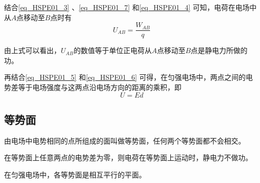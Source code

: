 结合\autoref{eq_HSPE01_3} 、\autoref{eq_HSPE01_7} 和\autoref{eq_HSPE01_4} 可知，电荷在电场中从$A$点移动至$B$点时有
\begin{equation}\label{eq_HSPE01_6}
U_{AB} = \frac{W_{AB}}{q}
\end{equation}

由上式可以看出，$U_{AB}$的数值等于单位正电荷从$A$点移动至$B$点是静电力所做的功。

再结合\autoref{eq_HSPE01_5} 和\autoref{eq_HSPE01_6} 可得，在匀强电场中，两点之间的电势差等于电场强度与这两点沿电场方向的距离的乘积，即
\begin{equation}
U=Ed
\end{equation}

\subsection{等势面}

由电场中电势相同的点所组成的面叫做等势面，任何两个等势面都不会相交。

在等势面上任意两点的电势差为零，则电荷在等势面上运动时，静电力不做功。

在匀强电场中，各等势面是相互平行的平面。
